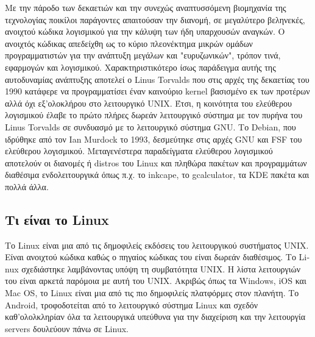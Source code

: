 \documentclass{article}
\begin{document}
{Με την πάροδο των δεκαετιών και την συνεχώς αναπτυσσόμενη βιομηχανία της τεχνολογίας ποικίλοι παράγοντες απαιτούσαν την διανομή, σε μεγαλύτερο βεληνεκές, ανοιχτού κώδικα λογισμικού για την κάλυψη των ήδη υπαρχουσών αναγκών. O ανοιχτός κώδικας απεδείχθη ως 
το κύριο πλεονέκτημα μικρών ομάδων προγραμματιστών για την ανάπτυξη μεγάλων και "ευρυζωνικών", τρόπον τινά, εφαρμογών και λογισμικού. Χαρακτηριστικότερο ίσως παράδειγμα αυτής της αυτοδυναμίας ανάπτυξης αποτελεί ο \textlatin{Linus Torvalds} που 
στις αρχές της δεκαετίας του 1990 κατάφερε να προγραμματίσει έναν καινούριο \textlatin{kernel} βασισμένο εκ των προτέρων αλλά όχι εξ'ολοκλήρου στο λειτουργικό 
\textlatin{UNIX}. Έτσι, η κοινότητα του ελεύθερου λογισμικού έλαβε το πρώτο πλήρες δωρεάν λειτουργικό σύστημα με τον πυρήνα του \textlatin{Linus Torvalds} σε συνδυασμό με το λειτουργικό σύστημα \textlatin{GNU}. Το \textlatin{Debian}, που ιδρύθηκε από τον \textlatin{Ian Murdock} το 1993, δεσμεύτηκε στις αρχές \textlatin{GNU} και \textlatin{FSF} του ελεύθερου λογισμικού. Μεταγενέστερα παραδείγματα ελεύθερου λογισμικού αποτελούν οι διανομές ή \textlatin{distros} του \textlatin{Linux} και πληθώρα πακέτων και προγραμμάτων διαθέσιμα ενδολειτουργικά όπως π.χ. το \textlatin{inkcape}, το \textlatin{gcalculator}, τα \textlatin{KDE} πακέτα και πολλά άλλα.

\subsection{Τι είναι το  \textlatin{Linux}}


Το \textlatin{Linux} είναι μια από τις δημοφιλείς εκδόσεις του λειτουργικού συστήματος \textlatin{UNIX}. Είναι ανοιχτού κώδικα καθώς ο πηγαίος κώδικας του είναι δωρεάν διαθέσιμος. Το \textlatin{Linux} σχεδιάστηκε λαμβάνοντας υπόψη τη συμβατότητα \textlatin{UNIX}. Η λίστα λειτουργιών του είναι αρκετά παρόμοια με αυτή του \textlatin{UNIX}. Ακριβώς όπως τα \textlatin{Windows}, \textlatin{iOS} και \textlatin{Mac OS}, το \textlatin{Linux} είναι μια από τις πιο δημοφιλείς πλατφόρμες στον πλανήτη. Το \textlatin{Android}, τροφοδοτείται από το λειτουργικό σύστημα \textlatin{Linux} και σχεδόν καθ'ολολκληρίαν όλα τα λειτουργικά υπεύθυνα για την διαχείριση και την λειτουργία \textlatin{servers} δουλεύουν πάνω σε \textlatin{Linux}. 

}
\end{document}
